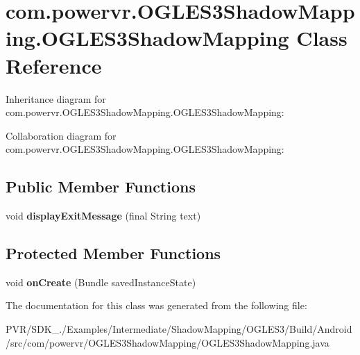 \hypertarget{classcom_1_1powervr_1_1_o_g_l_e_s3_shadow_mapping_1_1_o_g_l_e_s3_shadow_mapping}{\section{com.\+powervr.\+O\+G\+L\+E\+S3\+Shadow\+Mapping.\+O\+G\+L\+E\+S3\+Shadow\+Mapping Class Reference}
\label{classcom_1_1powervr_1_1_o_g_l_e_s3_shadow_mapping_1_1_o_g_l_e_s3_shadow_mapping}
}


Inheritance diagram for com.\+powervr.\+O\+G\+L\+E\+S3\+Shadow\+Mapping.\+O\+G\+L\+E\+S3\+Shadow\+Mapping\+:


Collaboration diagram for com.\+powervr.\+O\+G\+L\+E\+S3\+Shadow\+Mapping.\+O\+G\+L\+E\+S3\+Shadow\+Mapping\+:
\subsection*{Public Member Functions}
\begin{DoxyCompactItemize}
\item 
\hypertarget{classcom_1_1powervr_1_1_o_g_l_e_s3_shadow_mapping_1_1_o_g_l_e_s3_shadow_mapping_a652a59436ed8bba08834e59db66c8974}{void {\bfseries display\+Exit\+Message} (final String text)}\label{classcom_1_1powervr_1_1_o_g_l_e_s3_shadow_mapping_1_1_o_g_l_e_s3_shadow_mapping_a652a59436ed8bba08834e59db66c8974}

\end{DoxyCompactItemize}
\subsection*{Protected Member Functions}
\begin{DoxyCompactItemize}
\item 
\hypertarget{classcom_1_1powervr_1_1_o_g_l_e_s3_shadow_mapping_1_1_o_g_l_e_s3_shadow_mapping_a18b35fd0437adad7bc846149378c227f}{void {\bfseries on\+Create} (Bundle saved\+Instance\+State)}\label{classcom_1_1powervr_1_1_o_g_l_e_s3_shadow_mapping_1_1_o_g_l_e_s3_shadow_mapping_a18b35fd0437adad7bc846149378c227f}

\end{DoxyCompactItemize}


The documentation for this class was generated from the following file\+:\begin{DoxyCompactItemize}
\item 
P\+V\+R/\+S\+D\+K\+\_./\+Examples/\+Intermediate/\+Shadow\+Mapping/\+O\+G\+L\+E\+S3/\+Build/\+Android/src/com/powervr/\+O\+G\+L\+E\+S3\+Shadow\+Mapping/O\+G\+L\+E\+S3\+Shadow\+Mapping.\+java\end{DoxyCompactItemize}
